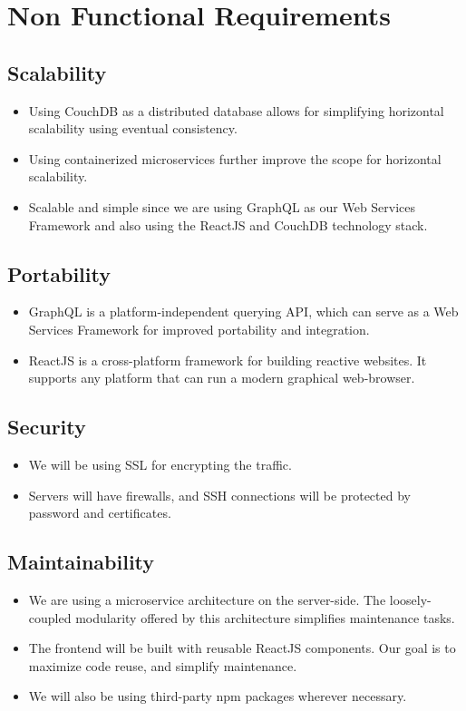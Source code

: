 \section{Non Functional Requirements}

\subsection{Scalability}
\begin{itemize}
    \item Using CouchDB as a distributed database allows for simplifying 
    horizontal scalability using eventual consistency.
    \item Using containerized microservices further improve the scope for horizontal scalability.
    \item Scalable and simple since we are using GraphQL as our Web Services Framework and also using the ReactJS and CouchDB technology stack.
\end{itemize}

\subsection{Portability}
\begin{itemize}
    \item GraphQL is a platform-independent querying API, 
    which can serve as a Web Services Framework for improved portability and integration.
    \item ReactJS is a cross-platform framework for building reactive websites. 
    It supports any platform that can run a modern graphical web-browser.
\end{itemize}

\subsection{Security}
\begin{itemize}
    \item We will be using SSL for encrypting the traffic.
    \item Servers will have firewalls, and SSH connections will be protected by password and certificates.
\end{itemize}

\subsection{Maintainability}
\begin{itemize}
    \item We are using a microservice architecture on the server-side. 
    The loosely-coupled modularity offered by this architecture simplifies maintenance tasks.
    \item The frontend will be built with reusable ReactJS components. 
    Our goal is to maximize code reuse, and simplify maintenance.
    \item We will also be using third-party npm packages wherever necessary.
\end{itemize}

